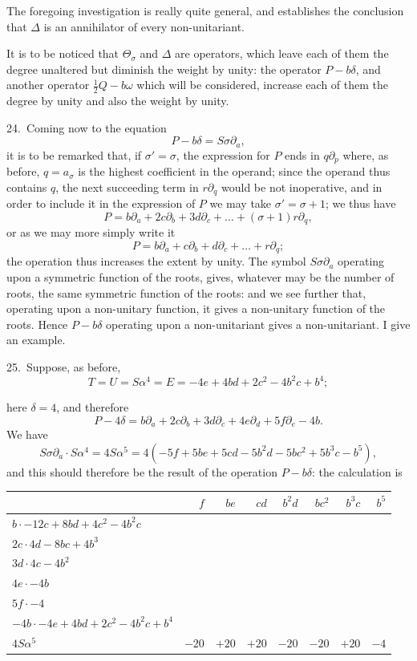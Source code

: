 \documentclass[11pt]{article}
\begin{document}
The foregoing investigation is really quite general, and establishes the conclusion that $\Delta$ is an annihilator of every non-unitariant.

It is to be noticed that $\Theta_\sigma$ and $\Delta$ are operators, which leave each of them the degree unaltered but diminish the weight by unity: the operator $P - b\delta$, and another operator $\tfrac{1}{2}Q - b\omega$ which will be considered, increase each of them the degree by unity and also the weight by unity.

24.\ Coming now to the equation
\[
P - b\delta = S\sigma\partial_a,
\]
it is to be remarked that, if $\sigma' = \sigma$, the expression for $P$ ends in $q\partial_p$ where, as before, $q = a_\sigma$ is the highest coefficient in the operand; since the operand thus contains $q$, the next succeeding term in $r\partial_q$ would be not inoperative, and in order to include it in the expression of $P$ we may take $\sigma' = \sigma + 1$; we thus have
\[
P = b\partial_a + 2c\partial_b + 3d\partial_c + \ldots + (\sigma + 1) r\partial_q,
\]
or as we may more simply write it
\[
P = b\partial_a + c\partial_b + d\partial_c + \ldots + r\partial_q;
\]
the operation thus increases the extent by unity. The symbol $S\sigma\partial_a$ operating upon a symmetric function of the roots, gives, whatever may be the number of roots, the same symmetric function of the roots: and we see further that, operating upon a non-unitary function, it gives a non-unitary function of the roots. Hence $P - b\delta$ operating upon a non-unitariant gives a non-unitariant. I give an example.

25.\ Suppose, as before,
\[
T = U = S\alpha^4 = E = -4e + 4bd + 2c^2 - 4b^2c + b^4;
\]

here $\delta = 4$, and therefore
\[
P - 4\delta = b\partial_a + 2c\partial_b + 3d\partial_c + 4e\partial_d + 5f\partial_e - 4b.
\]
We have
\[
S\sigma\partial_a \cdot S\alpha^4 = 4S\alpha^5 = 4(-5f + 5be + 5cd - 5b^2d - 5bc^2 + 5b^3c - b^5),
\]
and this should therefore be the result of the operation $P - b\delta$: the calculation is

\begin{center}
\begin{tabular}{l|rrrrrrr}
 & $f$ & $be$ & $cd$ & $b^2d$ & $bc^2$ & $b^3c$ & $b^5$ \\
\hline
$b \cdot -12c + 8bd + 4c^2 - 4b^2c$ & & & & & & & \\
$2c \cdot 4d - 8bc + 4b^3$ & & & & & & & \\
$3d \cdot 4c - 4b^2$ & & & & & & & \\
$4e \cdot -4b$ & & & & & & & \\
$5f \cdot -4$ & & & & & & & \\
$-4b \cdot -4e + 4bd + 2c^2 - 4b^2c + b^4$ & & & & & & & \\
\hline
$4S\alpha^5$ & $-20$ & $+20$ & $+20$ & $-20$ & $-20$ & $+20$ & $-4$ \\
\end{tabular}
\end{center}
\end{document}
